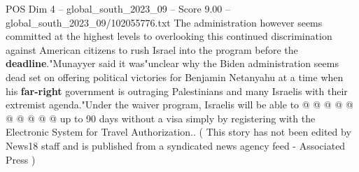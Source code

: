 \begin{textsample}{POS Dim 4 – global\_south\_2023\_09 – Score 9.00 – global\_south\_2023\_09/102055776.txt}
The administration however seems committed at the highest levels to overlooking this continued discrimination against American citizens to rush Israel into the program before the \textbf{deadline}."Munayyer said it was"unclear why the Biden administration seems dead set on offering political victories for Benjamin Netanyahu at a time when his \textbf{far-right} government is outraging Palestinians and many Israelis with their extremist agenda."Under the waiver program, Israelis will be able to @ @ @ @ @ @ @ @ @ @ up to 90 days without a visa simply by registering with the Electronic System for Travel Authorization.. ( This story has not been edited by News18 staff and is published from a syndicated news agency feed - Associated Press )

\end{textsample}
